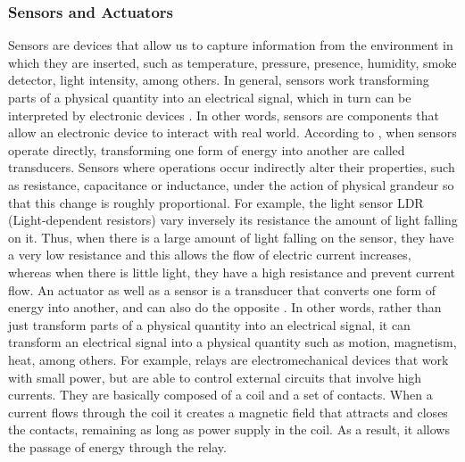 \documentclass{acm_proc_article-sp}
\begin{document}
\subsubsection{Sensors and Actuators}
Sensors are devices that allow us to capture information from the environment in which they are inserted, such as temperature, pressure, presence, humidity, smoke detector, light intensity, among others. In general, sensors work transforming parts of a physical quantity into an electrical signal, which in turn can be interpreted by electronic devices \cite{borges2010automaccao}. In other words, sensors are components that allow an electronic device to interact with real world.
\newline
\newline
According to \cite{borges2010automaccao}, when sensors operate directly, transforming one form of energy into another are called transducers. Sensors where operations occur indirectly alter their properties, such as resistance, capacitance or inductance, under the action of physical grandeur so that this change is roughly proportional. For example, the light sensor LDR (Light-dependent resistors) vary inversely its resistance the amount of light falling on it. Thus, when there is a large amount of light falling on the sensor, they have a very low resistance and this allows the flow of electric current increases, whereas when there is little light, they have a high resistance and prevent current flow.
\newline
\newline
An actuator as well as a sensor is a transducer that converts one form of energy into another, and can also do the opposite \cite{borges2010automaccao}. In other words, rather than just  transform parts of a physical quantity into an electrical signal, it can transform an electrical signal into a physical quantity such as motion, magnetism, heat, among others. For example, relays are electromechanical devices that work with small power, but are able to control external circuits that involve high currents. They are basically composed of a coil and a set of contacts. When a current flows through the coil it creates a magnetic field that attracts and closes the contacts, remaining as long as power supply in the coil. As a result, it allows the passage of energy through the relay.
\end{document}
